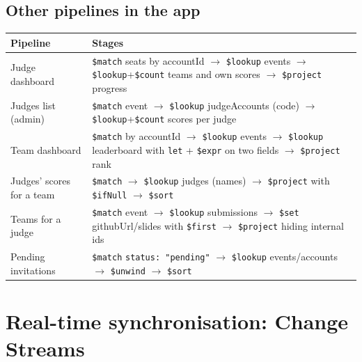 \documentclass[11pt,a4paper]{article}
\newcommand{\op}[1]{\texttt{\$#1}}
\begin{document}
\subsection{Other pipelines in the app}
\begin{tabularx}{\linewidth}{@{}p{4.1cm}X@{}}
\toprule
\textbf{Pipeline} & \textbf{Stages}\\
\midrule
Judge dashboard & \op{match} seats by accountId $\rightarrow$ \op{lookup} events $\rightarrow$ \op{lookup}+\op{count} teams and own scores $\rightarrow$ \op{project} progress \\
Judges list (admin) & \op{match} event $\rightarrow$ \op{lookup} judgeAccounts (code) $\rightarrow$ \op{lookup}+\op{count} scores per judge \\
Team dashboard & \op{match} by accountId $\rightarrow$ \op{lookup} events $\rightarrow$ \op{lookup} leaderboard with \texttt{let} + \op{expr} on two fields $\rightarrow$ \op{project} rank \\
Judges' scores for a team & \op{match} $\rightarrow$ \op{lookup} judges (names) $\rightarrow$ \op{project} with \op{ifNull} $\rightarrow$ \op{sort} \\
Teams for a judge & \op{match} event $\rightarrow$ \op{lookup} submissions $\rightarrow$ \op{set} githubUrl/slides with \op{first} $\rightarrow$ \op{project} hiding internal ids \\
Pending invitations & \op{match} \texttt{status: "pending"} $\rightarrow$ \op{lookup} events/accounts $\rightarrow$ \op{unwind} $\rightarrow$ \op{sort} \\
\bottomrule
\end{tabularx}

\section{Real-time synchronisation: Change Streams}\label{sec:sync}
\end{document}

